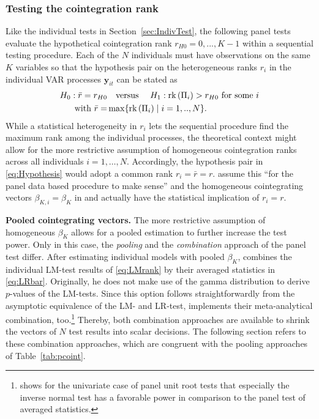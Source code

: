 \subsubsection{Testing the cointegration rank}
Like the individual tests in Section~\ref{sec:IndivTest}, the following panel tests evaluate the hypothetical cointegration rank $ r_{H0}=0,...,K-1 $ within a sequential testing procedure. Each of the $ N $ individuals must have observations on the same $ K $ variables so that the hypothesis pair on the heterogeneous ranks $ r_i $ in the individual VAR processes $ \boldsymbol{y}_{it} $ can be stated as
\begin{align} \label{eq:Hypothesis}
\begin{split}
	H_0: \bar{r} = r_{H0} & \text{\quad versus \quad} H_1: \text{rk}\left( \Pi_i \right) > r_{H0} \ \text{for some} \ i \\
	\text{with} \ \bar{r} = & \max \{ \text{rk}\left( \Pi_i \right) \mid i=1,..,N \}.
\end{split}
\end{align}
While a statistical heterogeneity in $ r_i $ lets the sequential procedure find the maximum rank among the individual processes, the theoretical context might allow for the more restrictive assumption of homogeneous cointegration ranks across all individuals $ i=1,\ldots,N$. Accordingly, the hypothesis pair in \eqref{eq:Hypothesis} would adopt a common rank $ r_i = \bar{r} = r $. \citet[p.~9]{SilvestreSurdeanu2011} assume this ``for the panel data based procedure to make sense'' and the homogeneous cointegrating vectors $ \beta_{K,i} = \beta_K $ in \citet{Breitung2005} and \citet{GroenFrank2003} actually have the statistical implication of $ r_i = r $.


\textbf{Pooled cointegrating vectors.} The more restrictive assumption of homogeneous $ \beta_K $ allows for a pooled estimation to further increase the test power. Only in this case, the \textit{pooling} and the \textit{combination} approach of the panel test differ. After estimating individual models with pooled $ \beta_K $, \citet{Breitung2005} combines the individual LM-test results of \eqref{eq:LMrank} by their averaged statistics in \eqref{eq:LRbar}. Originally, he does not make use of the gamma distribution to derive $p$-values of the LM-tests. Since this option follows straightforwardly from the asymptotic equivalence of the LM- and LR-test,  implements their meta-analytical combination, too.\footnote{\citet[p.~268]{Choi2001} shows for the univariate case of panel unit root tests that especially the inverse normal test has a favorable power in comparison to the panel test of averaged statistics.} Thereby, both combination approaches are available to shrink the vectors of $ N $ test results into scalar decisions. The following section refers to these combination approaches, which are congruent with the pooling approaches of Table~\ref{tab:pcoint}.


